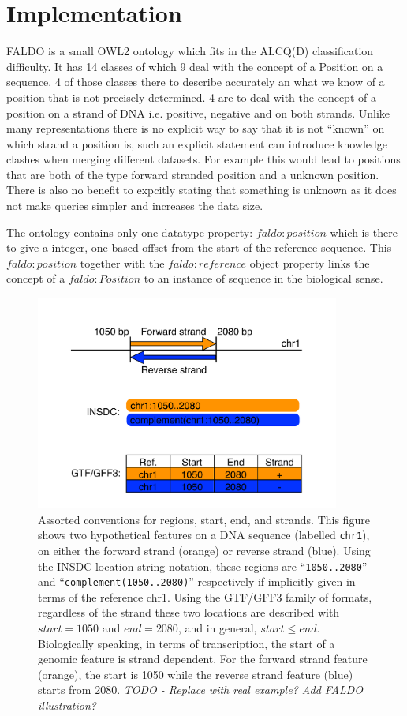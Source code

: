 \section*{Implementation}

FALDO is a small OWL2 ontology which fits in the ALCQ(D) classification difficulty.
It has 14 classes of which 9 deal with the concept of a Position on a sequence. 
4 of those classes there to describe accurately an what we know of a position that is not precisely determined. 
4 are to deal with the concept of a position on a strand of DNA i.e. positive, negative and on both strands.
Unlike many representations there is no explicit way to say that it is not ``known'' on which strand a position is,
such an explicit statement can introduce knowledge clashes when merging different datasets.
For example this would lead to positions that are both of the type forward stranded position and a unknown position.
There is also no benefit to expcitly stating that something is unknown as it does not make queries simpler and 
increases the data size.

The ontology contains only one datatype property: $faldo:position$ which is there to give a integer, one based offset from 
the start of the reference sequence. This $faldo:position$ together with the $faldo:reference$ object property links the concept
of a $faldo:Position$ to an instance of sequence in the biological sense.

\begin{figure}[p]
\begin{center}
\includegraphics[width=10cm]{figures/figure-strand.pdf}
\end{center}
\caption{Assorted conventions for regions, start, end, and strands.
This figure shows two hypothetical features on a DNA sequence
(labelled \texttt{chr1}), on either the forward strand (orange) or
reverse strand (blue).
Using the INSDC location string notation, these regions are
``\texttt{1050..2080}'' and ``\texttt{complement(1050..2080)}''
respectively if implicitly given in terms of the reference chr1.
Using the GTF/GFF3 family of formats, regardless of the
strand these two locations are described with $start = 1050$
and $end = 2080$, and in general, $start \leq end$.
Biologically speaking, in terms of transcription, the start of a genomic
feature is strand dependent.
For the forward strand feature (orange), the start is 1050
while the reverse strand feature (blue) starts from 2080.
\textit{TODO - Replace with real example? Add FALDO illustration?}
}
\label{fig:strands}
\end{figure}

